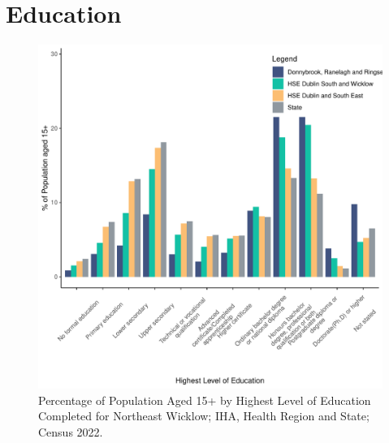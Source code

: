 \documentclass{article}
\begin{document}
\section{Education}\label{sect:Edu}
\begin{figure}[H]
	\centering
	\includegraphics[width = 120mm]{../figures/EduED.pdf}
	\caption{Percentage of Population Aged 15+ by Highest Level of Education Completed for Northeast Wicklow; IHA, Health Region and State; Census 2022.}
	\label{fig:vbnv}
	\end{figure}
\end{document}
